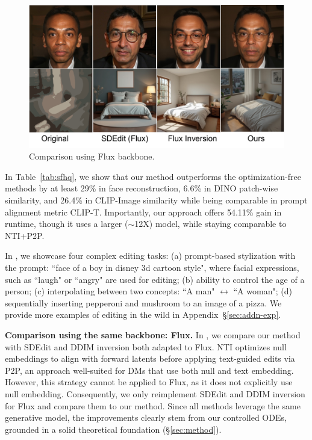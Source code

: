 \documentclass{article} %
\theoremstyle{plain}
\begin{document}
\begin{figure}  %
\vspace{-2ex}  
\includegraphics[width=\linewidth]{pics/comp-flux-backbone-v2.pdf}
\caption{
Comparison using Flux backbone.
}
\label{fig:comp-flix-bb}
\vspace{-2ex}  
\end{figure}
In Table~\ref{tab:sfhq}, we show that our method outperforms the optimization-free methods by at least 29\% in face reconstruction, 6.6\% in DINO patch-wise similarity, and 26.4\% in CLIP-Image similarity while being comparable in prompt alignment metric CLIP-T. 
Importantly, our approach offers 54.11\% gain in runtime, though it uses a larger ($\sim$12X) model, while staying comparable to NTI+P2P.


In , we showcase four complex editing tasks: 
(a) prompt-based stylization with the prompt: ``face of a boy in disney 3d cartoon style", where facial expressions, such as ``laugh" or ``angry" are used for editing;
(b) ability to control the age of a person;
(c) interpolating between two concepts: ``A man" $\leftrightarrow$ ``A woman";
(d) sequentially inserting pepperoni and mushroom to an image of a pizza.
We provide more examples of editing in the wild in Appendix~\S\ref{sec:addn-exp}.





\textbf{Comparison using the same backbone: Flux.}
In , we compare our method with SDEdit and DDIM inversion both adapted to Flux.
NTI optimizes null embeddings to align with forward latents before applying text-guided edits via P2P, an approach well-suited for DMs that use both null and text embedding. 
However, this strategy cannot be applied to Flux, as it does not explicitly use null embedding. 
Consequently, we only reimplement SDEdit and DDIM inversion for Flux and compare them to our method.
Since all methods leverage the same generative model, the improvements clearly stem from our controlled ODEs, grounded in a solid theoretical foundation (\S\ref{sec:method}). 
\end{document}
